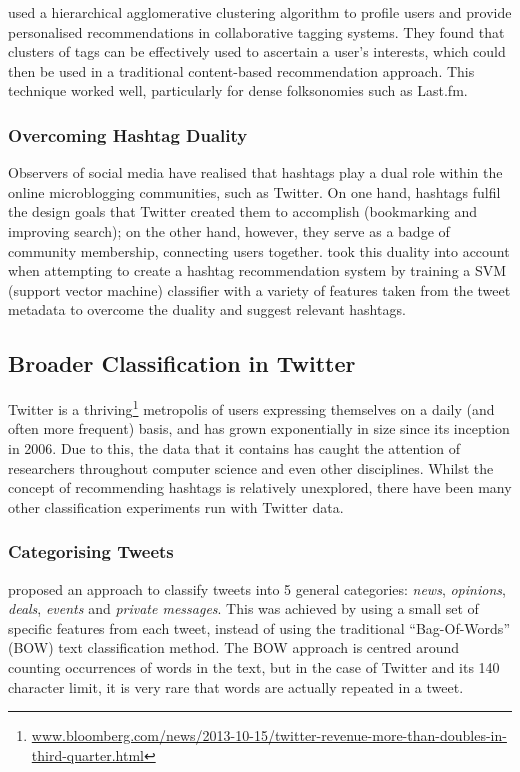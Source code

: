 \documentclass[12pt,a4paper]{article}
\begin{document}
\textcite{Shepitsen:2008} used a hierarchical agglomerative clustering algorithm to profile users and provide personalised recommendations in collaborative tagging systems. They found that clusters of tags can be effectively used to ascertain a user's interests, which could then be used in a traditional content-based recommendation approach. This technique worked well, particularly for dense folksonomies such as Last.fm.

\subsubsection{Overcoming Hashtag Duality}
Observers of social media have realised that hashtags play a dual role within the online microblogging communities, such as Twitter. On one hand, hashtags fulfil the design goals that Twitter created them to accomplish (bookmarking and improving search); on the other hand, however, they serve as a badge of community membership, connecting users together. \textcite{Yang:2012} took this duality into account when attempting to create a hashtag recommendation system by training a SVM (support vector machine) classifier with a variety of features taken from the tweet metadata to overcome the duality and suggest relevant hashtags.

\subsection{Broader Classification in Twitter}
Twitter is a thriving\footnote{\url{www.bloomberg.com/news/2013-10-15/twitter-revenue-more-than-doubles-in-third-quarter.html}} metropolis of users expressing themselves on a daily (and often more frequent) basis, and has grown exponentially in size since its inception in 2006. Due to this, the data that it contains has caught the attention of researchers throughout computer science and even other disciplines. Whilst the concept of recommending hashtags is relatively unexplored, there have been many other classification experiments run with Twitter data.

\subsubsection{Categorising Tweets}
\textcite{Sriram:2010} proposed an approach to classify tweets into 5 general categories: \emph{news}, \emph{opinions}, \emph{deals}, \emph{events} and \emph{private messages}. This was achieved by using a small set of specific features from each tweet, instead of using the traditional ``Bag-Of-Words'' (BOW) text classification method. The BOW approach is centred around counting occurrences of words in the text, but in the case of Twitter and its 140 character limit, it is very rare that words are actually repeated in a tweet.
\end{document}
